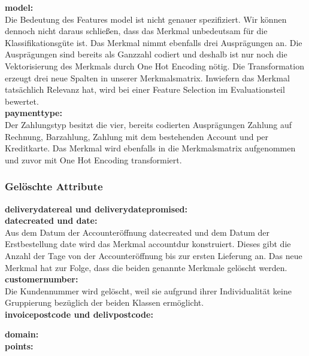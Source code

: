 \textbf{model:}\\

Die Bedeutung des Features model ist nicht genauer spezifiziert. Wir können dennoch nicht daraus schließen, dass das Merkmal unbedeutsam für die Klassifikationsgüte ist. Das Merkmal nimmt ebenfalls drei Ausprägungen an. Die Ausprägungen sind bereits als Ganzzahl codiert und deshalb ist nur noch die Vektorisierung des Merkmals durch One Hot Encoding nötig. Die Transformation erzeugt drei neue Spalten in unserer Merkmalsmatrix. Inwiefern das Merkmal tatsächlich Relevanz hat, wird bei einer Feature Selection im Evaluationsteil bewertet.\\

\textbf{paymenttype:}\\

Der Zahlungstyp besitzt die vier, bereits codierten Ausprägungen Zahlung auf Rechnung, Barzahlung, Zahlung mit dem bestehenden Account und per Kreditkarte. Das Merkmal wird ebenfalls in die Merkmalsmatrix aufgenommen und zuvor mit One Hot Encoding transformiert.

\subsubsection{Gelöschte Attribute}

\textbf{deliverydatereal und deliverydatepromised:}\\


\textbf{datecreated und date:}\\

Aus dem Datum der Accounteröffnung datecreated und dem Datum der Erstbestellung date wird das Merkmal accountdur konstruiert. Dieses gibt die Anzahl der Tage von der Accounteröffnung bis zur ersten Lieferung an. Das neue Merkmal hat zur Folge, dass die beiden genannte Merkmale gelöscht werden.\\

\textbf{customernumber:}\\

Die Kundennummer wird gelöscht, weil sie aufgrund ihrer Individualität keine Gruppierung bezüglich der beiden Klassen ermöglicht.\\

\textbf{invoicepostcode und delivpostcode:}

\textbf{domain:}\\

\textbf{points:}\\

